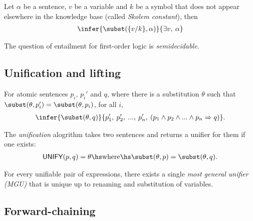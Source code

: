 \documentclass{article}
\begin{document}
\begin{theorem}
    Let $\alpha$ be a sentence, $v$ be a variable and $k$ be a
    symbol that does not appear elsewhere in the knowledge base
    (called \emph{Skolem constant}), then 
    \begin{align*}
        \infer{\subst(\{v/k\},\alpha)}{\exists v,\:\alpha}
    \end{align*} 
\end{theorem}

\begin{theorem}[R\&N p. 325]
    The question of entailment for first-order logic is \emph{semidecidable}.
\end{theorem} 

\subsection{Unification and lifting}

\begin{theorem}
    For atomic sentences $p_i$, $p_i'$ and $q$, where there is a substitution
    $\theta$ such that $\subst(\theta,p_i')=\subst(\theta,p_i)$, for
    all $i$,
    \begin{align*}
        \infer{\subst(\theta,q)}{p_1',\: p_2',\: ...,\: p_n',\:(p_1\wedge p_2 \wedge ... \wedge p_n\Rightarrow q)}.
    \end{align*}
\end{theorem}

\begin{definition}[R\&N p. 326]
    The \emph{unification} alogrithm takes two sentences and returns a unifier
    for them if one exists:
    \begin{align*}
        \textsf{UNIFY}(p,q)=\theta \hs\text{where}\hs \subst(\theta,p)=\subst(\theta,q).
    \end{align*}
\end{definition}

\begin{theorem}[R\&N p. 327]
    For every unifiable pair of expressions, there exists a single \emph{most general
    unifier (MGU)} that is unique up to renaming and substitution of variables.
\end{theorem}

\subsection{Forward-chaining}
\end{document}
